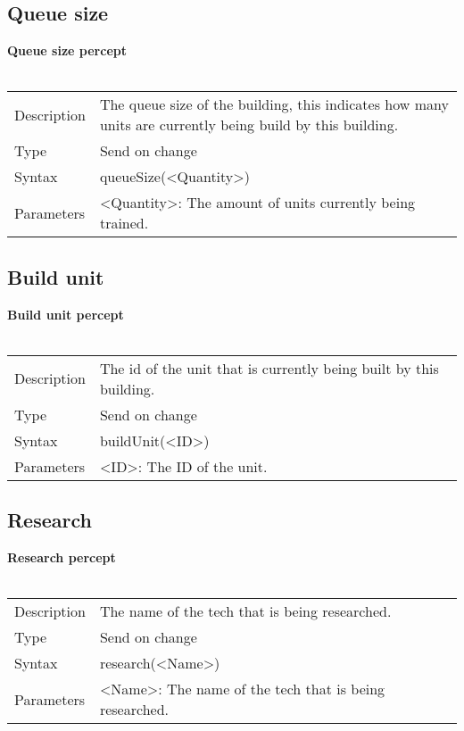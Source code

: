 \documentclass[english,11pt]{report}
\begin{document}
\newpage
\subsection{Queue size}
\textbf{Queue size percept}\\
\\
\begin{tabularx}{\textwidth}{lX}
 Description & The queue size of the building, this indicates how many units are currently being build by this building. \\
 Type & Send on change \\
 Syntax & queueSize(<Quantity>) \\
 Parameters &   <Quantity>: The amount of units currently being trained.
\end{tabularx}

\subsection{Build unit}
\textbf{Build unit percept}\\
\\
\begin{tabularx}{\textwidth}{lX}
 Description & The id of the unit that is currently being built by this building. \\
 Type & Send on change \\
 Syntax & buildUnit(<ID>) \\
 Parameters &   <ID>: The ID of the unit.
\end{tabularx}

\subsection{Research}
\textbf{Research percept}\\
\\
\begin{tabularx}{\textwidth}{lX}
 Description & The name of the tech that is being researched. \\
 Type & Send on change \\
 Syntax & research(<Name>) \\
 Parameters &   <Name>: The name of the tech that is being researched.
\end{tabularx}
\end{document}
